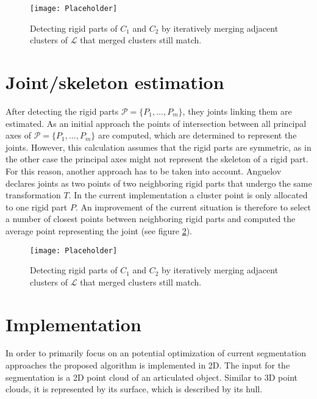 \begin{figure}
	\centering
	\texttt{[image: Placeholder]}
	\caption{Detecting rigid parts of $C_1$ and $C_2$ by iteratively merging adjacent clusters of $\mathcal{L}$ that merged clusters still match.}
	\label{fig:clusterMerging}
\end{figure}

\section{Joint/skeleton estimation}

After detecting the rigid parts $\mathcal{P} =  \{ {P_1,\ldots,P_m}\}$, they joints linking them are estimated. As an initial approach the points of intersection between all principal axes of $\mathcal{P} = \{ {P_1,\ldots,P_m}\}$ are computed, which are determined to represent the joints. However, this calculation assumes that the rigid parts are symmetric, as in the other case the principal axes might not represent the skeleton of a rigid part. For this reason, another approach has to be taken into account. Anguelov \cite{Anguelov04} declares joints as two points of two neighboring rigid parts that undergo the same transformation $T$. In the current implementation a cluster point is only allocated to one rigid part $P$. An improvement of the current situation is therefore to select a number of closest points between neighboring rigid parts and computed the average point representing the joint (see figure \ref{fig:jointEstimation}). 
\begin{figure}
	\centering
	\texttt{[image: Placeholder]}
	\caption{Detecting rigid parts of $C_1$ and $C_2$ by iteratively merging adjacent clusters of $\mathcal{L}$ that merged clusters still match.}
	\label{fig:jointEstimation}
\end{figure}
\section{Implementation}
In order to primarily focus on an potential optimization of current segmentation approaches the proposed algorithm is implemented in 2D. The input for the segmentation is a 2D point cloud of an articulated object. Similar to 3D point clouds, it is represented by its surface, which is described by its hull. 

